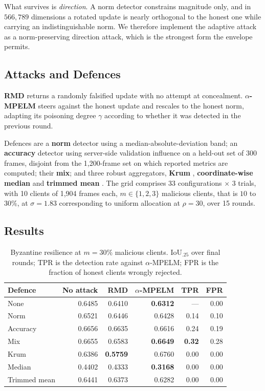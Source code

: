 \vspace{10pt}

What survives is \emph{direction}. A norm detector constrains magnitude only,
and in $566{,}789$ dimensions a rotated update is nearly orthogonal to the
honest one while carrying an indistinguishable norm. We therefore implement the
adaptive attack as a norm-preserving direction attack, which is the strongest
form the envelope permits.

\subsection{Attacks and Defences}

\textbf{RMD} returns a randomly falsified update with no attempt at concealment.
\textbf{$\alpha$-MPELM} steers against the honest update and rescales to the
honest norm, adapting its poisoning degree $\gamma$ according to whether it was
detected in the previous round.

\vspace{10pt}

Defences are a \textbf{norm} detector using a median-absolute-deviation band; an
\textbf{accuracy} detector using server-side validation influence on a held-out
set of 300 frames, disjoint from the 1,200-frame set on which reported metrics
are computed; their \textbf{mix}; and three robust aggregators,
\textbf{Krum} \cite{blanchard2017machine}, \textbf{coordinate-wise median} and
\textbf{trimmed mean} \cite{yin2018byzantine}. The grid comprises 33
configurations $\times$ 3 trials, with 10 clients of 1,904 frames each,
$m\in\{1,2,3\}$ malicious clients, that is $10$ to $30\%$, at $\sigma=1.83$
corresponding to uniform allocation at $\rho=30$, over 15 rounds.

\subsection{Results}

\begin{table}[H]
\centering
\caption{Byzantine resilience at $m=30\%$ malicious clients. IoU$_{.25}$ over
final rounds; TPR is the detection rate against $\alpha$-MPELM; FPR is the
fraction of honest clients wrongly rejected.}
\label{tab:p3}
\begin{tabular}{lrrrrr}
\toprule
Defence & No attack & RMD & $\alpha$-MPELM & TPR & FPR \\
\midrule
None & 0.6485 & 0.6410 & \textbf{0.6312} & --- & 0.00 \\
Norm & 0.6521 & 0.6446 & 0.6428 & 0.14 & 0.10 \\
Accuracy & 0.6656 & 0.6635 & 0.6616 & 0.24 & 0.19 \\
Mix & 0.6655 & 0.6583 & \textbf{0.6649} & \textbf{0.32} & 0.28 \\
Krum & 0.6386 & \textbf{0.5759} & 0.6760 & 0.00 & 0.00 \\
Median & 0.4402 & 0.4333 & \textbf{0.3168} & 0.00 & 0.00 \\
Trimmed mean & 0.6441 & 0.6373 & 0.6282 & 0.00 & 0.00 \\
\bottomrule
\end{tabular}
\end{table}


